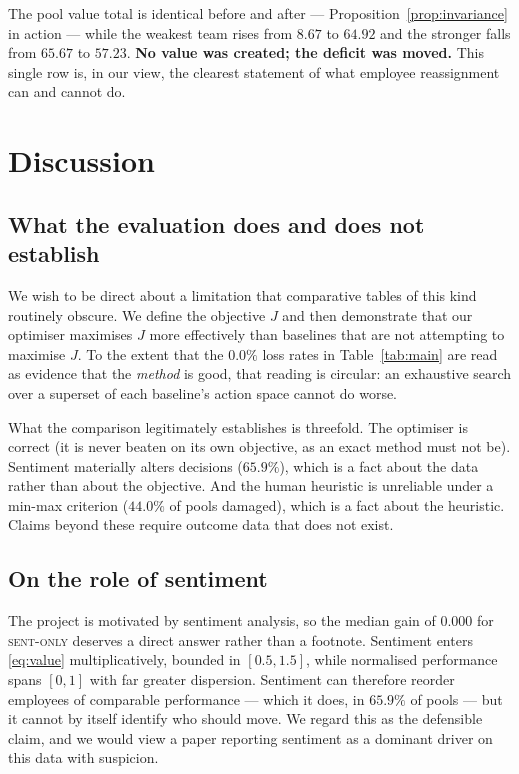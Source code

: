 \documentclass[conference]{IEEEtran}
\begin{document}
The pool value total is identical before and after --- Proposition~\ref{prop:invariance}
in action --- while the weakest team rises from $8.67$ to $64.92$ and the stronger
falls from $65.67$ to $57.23$. \textbf{No value was created; the deficit was
moved.} This single row is, in our view, the clearest statement of what employee
reassignment can and cannot do.

\section{Discussion}\label{sec:discussion}

\subsection{What the evaluation does and does not establish}
We wish to be direct about a limitation that comparative tables of this kind
routinely obscure. We define the objective $J$ and then demonstrate that our
optimiser maximises $J$ more effectively than baselines that are not attempting
to maximise $J$. To the extent that the $0.0\%$ loss rates in
Table~\ref{tab:main} are read as evidence that the \emph{method} is good, that
reading is circular: an exhaustive search over a superset of each baseline's
action space cannot do worse.

What the comparison legitimately establishes is threefold. The optimiser is
correct (it is never beaten on its own objective, as an exact method must not
be). Sentiment materially alters decisions ($65.9\%$), which is a fact about the
data rather than about the objective. And the human heuristic is unreliable under
a min-max criterion ($44.0\%$ of pools damaged), which is a fact about the
heuristic. Claims beyond these require outcome data that does not exist.

\subsection{On the role of sentiment}
The project is motivated by sentiment analysis, so the median gain of $0.000$ for
\textsc{sent-only} deserves a direct answer rather than a footnote. Sentiment
enters \eqref{eq:value} multiplicatively, bounded in $[0.5,1.5]$, while
normalised performance spans $[0,1]$ with far greater dispersion. Sentiment can
therefore reorder employees of comparable performance --- which it does, in
$65.9\%$ of pools --- but it cannot by itself identify who should move. We regard
this as the defensible claim, and we would view a paper reporting sentiment as a
dominant driver on this data with suspicion.
\end{document}
